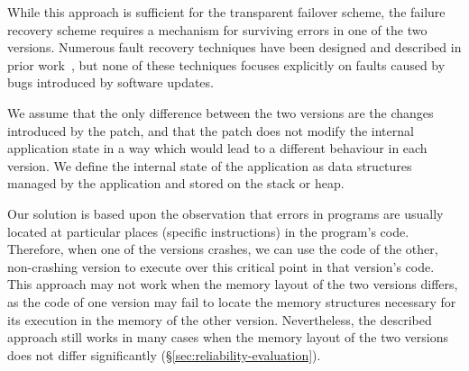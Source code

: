 While this approach is sufficient for the transparent failover scheme, the
failure recovery scheme requires a mechanism for surviving errors in one of the
two versions. Numerous fault recovery techniques have been designed and
described in prior
work~\cite{rx,compl-schedules11,fo,exec-trans06,vigilante,clearview,microreboots,shepherding:pldi14},
but none of these techniques focuses explicitly on faults caused by bugs
introduced by software updates.

We assume that the only difference between the two versions are the changes
introduced by the patch, and that the patch does not modify the internal
application state in a way which would lead to a different behaviour in each
version. We define the internal state of the application as data structures
managed by the application and stored on the stack or heap.

Our solution is based upon the observation that errors in programs are usually
located at particular places (\ie specific instructions) in the program's code.
Therefore, when one of the versions crashes, we can use the code of the other,
non-crashing version to execute over this critical point in that version's
code. This approach may not work when the memory layout of the two versions
differs, as the code of one version may fail to locate the memory structures
necessary for its execution in the memory of the other version.  Nevertheless,
the described approach still works in many cases when the memory layout of the
two versions does not differ significantly
(\S\ref{sec:reliability-evaluation}).

 
